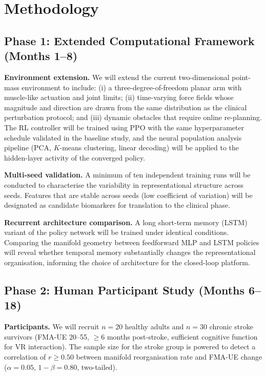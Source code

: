 \documentclass[12pt]{article}
\begin{document}
\section{Methodology}

\subsection{Phase 1: Extended Computational Framework (Months 1--8)}

\textbf{Environment extension.}
We will extend the current two-dimensional point-mass environment to
include: (i) a three-degree-of-freedom planar arm with muscle-like
actuation and joint limits; (ii) time-varying force fields whose magnitude
and direction are drawn from the same distribution as the clinical
perturbation protocol; and (iii) dynamic obstacles that require online
re-planning.
The RL controller will be trained using PPO with the same hyperparameter
schedule validated in the baseline study, and the neural population
analysis pipeline (PCA, $K$-means clustering, linear decoding) will be
applied to the hidden-layer activity of the converged policy.

\textbf{Multi-seed validation.}
A minimum of ten independent training runs will be conducted to characterise
the variability in representational structure across seeds.
Features that are stable across seeds (low coefficient of variation) will
be designated as candidate biomarkers for translation to the clinical phase.

\textbf{Recurrent architecture comparison.}
A long short-term memory (LSTM) variant of the policy network will be
trained under identical conditions.
Comparing the manifold geometry between feedforward MLP and LSTM policies
will reveal whether temporal memory substantially changes the
representational organisation, informing the choice of architecture for
the closed-loop platform.

\subsection{Phase 2: Human Participant Study (Months 6--18)}

\textbf{Participants.}
We will recruit $n=20$ healthy adults and $n=30$ chronic stroke survivors
(FMA-UE 20--55, $\geq$6 months post-stroke, sufficient cognitive function
for VR interaction).
The sample size for the stroke group is powered to detect a correlation
of $r \geq 0.50$ between manifold reorganisation rate and FMA-UE change
($\alpha = 0.05$, $1-\beta = 0.80$, two-tailed).
\end{document}
